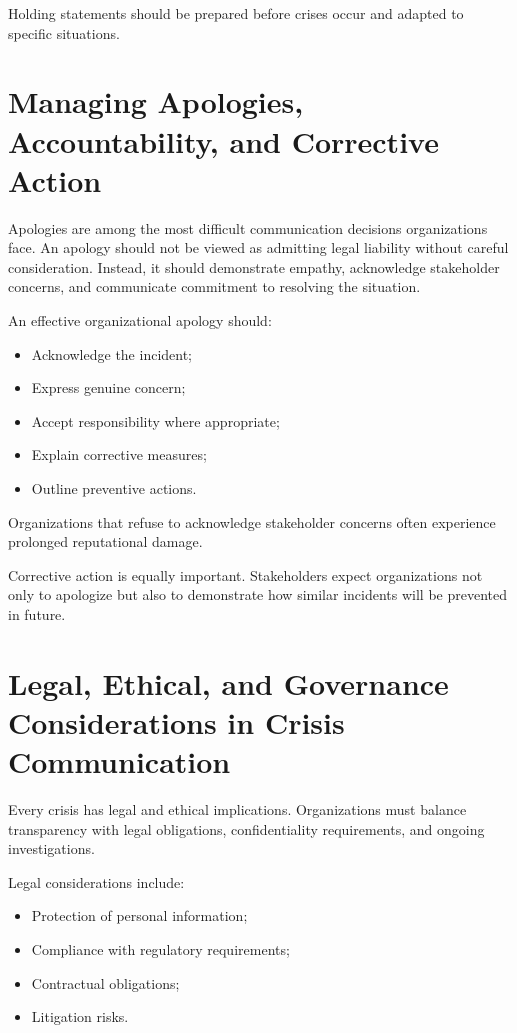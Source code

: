\documentclass[10pt]{article}
\begin{document}
Holding statements should be prepared before crises occur and adapted to specific situations.

\section*{Managing Apologies, Accountability, and Corrective Action}

Apologies are among the most difficult communication decisions organizations face. An apology should not be viewed as admitting legal liability without careful consideration. Instead, it should demonstrate empathy, acknowledge stakeholder concerns, and communicate commitment to resolving the situation.

An effective organizational apology should:
\begin{itemize}
    \item Acknowledge the incident;
    \item Express genuine concern;
    \item Accept responsibility where appropriate;
    \item Explain corrective measures;
    \item Outline preventive actions.
\end{itemize}

Organizations that refuse to acknowledge stakeholder concerns often experience prolonged reputational damage.

Corrective action is equally important. Stakeholders expect organizations not only to apologize but also to demonstrate how similar incidents will be prevented in future.

\section*{Legal, Ethical, and Governance Considerations in Crisis Communication}

Every crisis has legal and ethical implications. Organizations must balance transparency with legal obligations, confidentiality requirements, and ongoing investigations.

Legal considerations include:
\begin{itemize}
    \item Protection of personal information;
    \item Compliance with regulatory requirements;
    \item Contractual obligations;
    \item Litigation risks.
\end{itemize}
\end{document}
